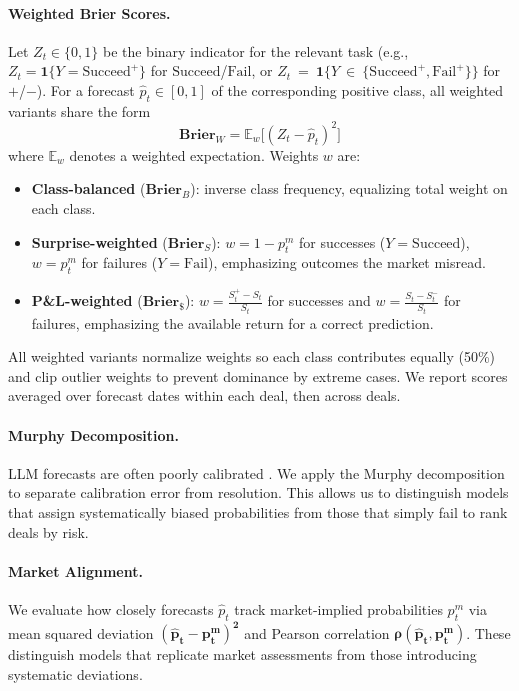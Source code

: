 \documentclass{article}
\theoremstyle{plain}
\theoremstyle{definition}
\theoremstyle{remark}
\newcommand{\Succeed}{\boldsymbol{\mathrm{Succeed}}}
\newcommand{\Fail}{\boldsymbol{\mathrm{Fail}}}
\newcommand{\Plus}{\boldsymbol{\mathrm{+}}}
\newcommand{\Minus}{\boldsymbol{\mathrm{-}}}
\newcommand{\SucceedPlus}{\boldsymbol{\mathrm{Succeed}^{+}}}
\newcommand{\FailPlus}{\boldsymbol{\mathrm{Fail}^{+}}}
\begin{document}
\paragraph{Weighted Brier Scores.}
Let $Z_t \in \{0,1\}$ be the binary indicator for the relevant task (e.g., $Z_t=\mathbf{1}\{Y=\SucceedPlus\}$ for $\Succeed$/$\Fail$, or $Z_t~=~\mathbf{1}\{Y~\in~\{\SucceedPlus,\FailPlus\}\}$ for $\Plus$/$\Minus$).
For a forecast $\hat{p}_t \in [0,1]$ of the corresponding positive class, all
weighted variants share the form
$$
\textbf{Brier}_W = \mathbb{E}_{w}\bigl[(Z_t - \hat{p}_t)^2\bigr]
$$
where $\mathbb{E}_w$ denotes a weighted expectation. Weights $w$ are:

\begin{itemize}
    \item \textbf{Class-balanced} ($\textbf{Brier}_B$): inverse class frequency,
    equalizing total weight on each class.
    \item \textbf{Surprise-weighted} ($\textbf{Brier}_S$): $w = 1-p^m_t$ for successes ($Y=\Succeed$), $w = p^m_t$ for failures
    ($Y=\Fail$), emphasizing outcomes the market misread.
    \item \textbf{P\&L-weighted} ($\textbf{Brier}_{\$}$): $w = \frac{S^+_t - S_t}{S_t}$
    for successes and $w = \frac{S_t - S^-_t}{S_t}$ for failures, emphasizing the available return for a correct prediction.
\end{itemize}

\noindent
All weighted variants normalize weights so each class contributes equally (50\%)
and clip outlier weights to prevent dominance by extreme cases. We report scores
averaged over forecast dates within each deal, then across deals.

\paragraph{Murphy Decomposition.} LLM forecasts are often poorly calibrated \cite{schoen2024wisdom, alur2025aia}. We apply the Murphy decomposition \cite{murphy1973new} to separate calibration error from resolution. This allows us to distinguish models that assign systematically biased probabilities from those that simply fail to rank deals by risk.

\paragraph{Market Alignment.} We evaluate how closely forecasts $\hat{p}_t$ track market-implied probabilities $p^m_t$ via mean squared deviation $\boldsymbol{(\hat{p}_t - p^m_t)^2}$ and Pearson correlation $\boldsymbol{\rho(\hat{p}_t, p^m_t)}$. These distinguish models that replicate market assessments from those introducing systematic deviations.
\end{document}
